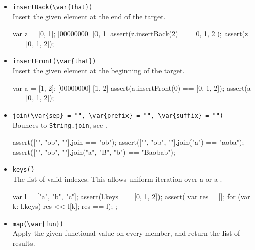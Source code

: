 \begin{itemize}
\item \lstinline|insertBack(\var{that})|\\
  Insert the given element at the end of the target.

\begin{urbiscript}[firstnumber=last]
var z = [0, 1];
[00000000] [0, 1]
assert(z.insertBack(2) == [0, 1, 2]);
assert(z == [0, 1, 2]);
\end{urbiscript}

\item \lstinline|insertFront(\var{that})|\\
  Insert the given element at the beginning of the target.

\begin{urbiscript}[firstnumber=last]
var a = [1, 2];
[00000000] [1, 2]
assert(a.insertFront(0) == [0, 1, 2]);
assert(a == [0, 1, 2]);
\end{urbiscript}

\item \lstinline|join(\var{sep} = "", \var{prefix} = "", \var{suffix} = "")|\\
  Bounces to \lstinline|String.join|, see .

\begin{urbiscript}[firstnumber=last]
assert(["", "ob", ""].join                == "ob");
assert(["", "ob", ""].join("a")           == "aoba");
assert(["", "ob", ""].join("a", "B", "b") == "Baobab");
\end{urbiscript}

\item \lstinline|keys()|\\
  The list of valid indexes.  This allows uniform iteration over a
   or a .

\begin{urbiscript}[firstnumber=last]
{
  var l = ["a", "b", "c"];
  assert(l.keys == [0, 1, 2]);
  assert({
           var res = [];
           for (var k: l.keys)
             res << l[k];
           res
         }
         == l);
};
\end{urbiscript}

\item \lstinline|map(\var{fun})|\\
Apply the given functional value on every member, and return the list
of results.



\end{itemize}
